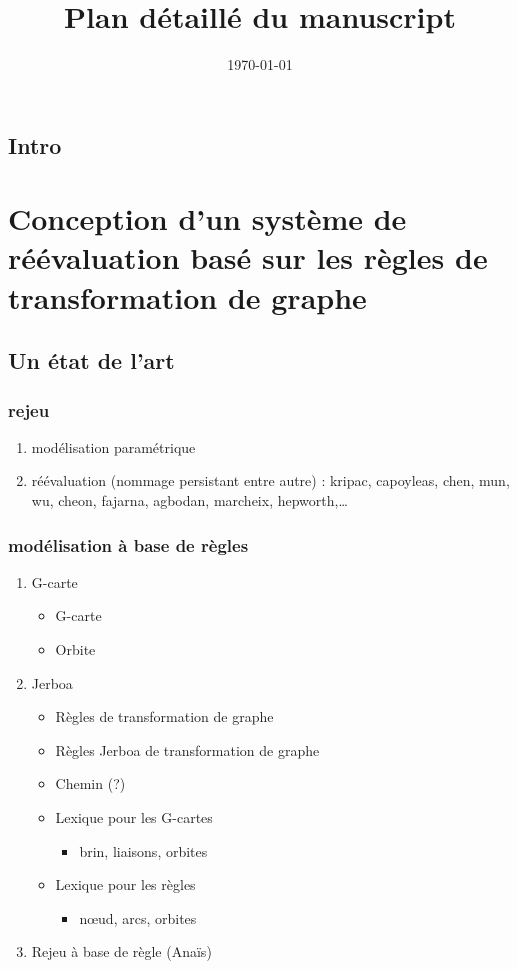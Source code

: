\documentclass[11pt]{article}
\date{\today}
\title{Plan détaillé du manuscript}
\begin{document}
\maketitle
\tableofcontents

\subsection{Intro}
\label{sec:orgea75187}
\section{Conception d'un système de réévaluation basé sur les règles de transformation de graphe}
\label{sec:org66fccae}
\subsection{Un état de l'art}
\label{sec:org227c66d}
\subsubsection{rejeu}
\label{sec:org542bf54}
\begin{enumerate}
\item modélisation paramétrique
\label{sec:orgf995bd1}
\item réévaluation (nommage persistant entre autre) : kripac, capoyleas, chen, mun, wu, cheon, fajarna, agbodan, marcheix, hepworth,…
\label{sec:orgf5d77c2}
\end{enumerate}
\subsubsection{modélisation à base de règles}
\label{sec:orgd6b046f}
\begin{enumerate}
\item G-carte
\label{sec:org105037a}
\begin{itemize}
\item G-carte
\item Orbite
\end{itemize}
\item Jerboa
\label{sec:org528b1d0}
\begin{itemize}
\item Règles de transformation de graphe
\item Règles Jerboa de transformation de graphe
\item Chemin (?)
\item Lexique pour les G-cartes
\begin{itemize}
\item brin, liaisons, orbites
\end{itemize}
\item Lexique pour les règles
\begin{itemize}
\item nœud, arcs, orbites
\end{itemize}
\end{itemize}
\item Rejeu à base de règle (Anaïs)
\label{sec:orge1dc033}
\end{enumerate}
\end{document}
